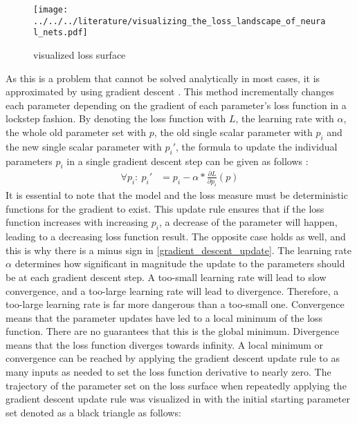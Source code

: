\documentclass[draft,final]{vutinfth} %
\begin{document}
    \begin{figure}[H]
        \centering{}
        \texttt{[image: ../../../literature/visualizing\_the\_loss\_landscape\_of\_neural\_nets.pdf]}
        \caption{visualized loss surface \cite[p. 1]{loss_vis}}
        \label{fig:loss_vis}
    \end{figure}
    As this is a problem that cannot be solved analytically in most cases, it is approximated by using gradient descent \cite{GradientDescent}.
    This method incrementally changes each parameter depending on the gradient of each parameter's loss function in a lockstep fashion.
    By denoting the loss function with $L$, the learning rate with $\alpha$, the whole old parameter set with $p$, the old single scalar parameter with $p_i$ and the new single scalar parameter with $p_i'$, the formula to update the individual parameters $p_i$ in a single gradient descent step can be given as follows \cite{GradientDescent}:
    \begin{align}
        \label{gradient_descent_update}
        \forall p_i:~p_i' &= p_i - \alpha * \frac{\partial{L}}{\partial{p_i}}(p)
    \end{align}
    It is essential to note that the model and the loss measure must be deterministic functions for the gradient to exist.
    This update rule ensures that if the loss function increases with increasing $p_i$, a decrease of the parameter will happen, leading to a decreasing loss function result.
    The opposite case holds as well, and this is why there is a minus sign in \ref{gradient_descent_update}.
    The learning rate $\alpha$ determines how significant in magnitude the update to the parameters should be at each gradient descent step.
    A too-small learning rate will lead to slow convergence, and a too-large learning rate will lead to divergence.
    Therefore, a too-large learning rate is far more dangerous than a too-small one.
    Convergence means that the parameter updates have led to a local minimum of the loss function.
    There are no guarantees that this is the global minimum. Divergence means that the loss function diverges towards infinity.
    A local minimum or convergence can be reached by applying the gradient descent update rule to as many inputs as needed to set the loss function derivative to nearly zero.
    The trajectory of the parameter set on the loss surface when repeatedly applying the gradient descent update rule was visualized in \cite[p. 2]{gradient_descent_vis} with the initial starting parameter set denoted as a black triangle as follows:
\end{document}
